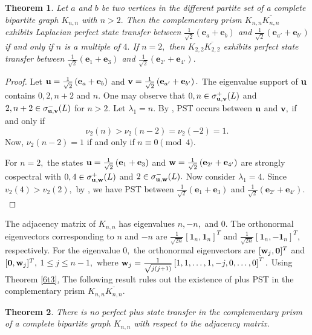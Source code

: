 \documentclass[12pt,a4paper]{article}
\newtheorem{thm}{Theorem}
\def \e {{\bf e}}
\def \u {{\bf u}}
\def \v {{\bf v}}
\def \w {{\bf w}}
\def \e {{\mathbf e}}
\newcommand{\ob}[1]{\left(#1\right)}
\newcommand{\tb}[1]{\left[#1\right]}
\begin{document}
\begin{thm}
      Let $a$ and $b$ be two vertices in the different partite set of a complete bipartite graph $K_{n,n}$ with $n>2.$ Then the complementary prism $K_{n,n}\overline{K_{n,n}}$ exhibits Laplacian perfect state transfer between $\frac{1}{\sqrt{2}}(\e_a+\e_b)$ and $\frac{1}{\sqrt{2}}(\e_{a'}+\e_{b'})$ if and only if $n$ is a multiple of $4.$ If $n=2,$ then $K_{2,2}\overline{K_{2,2}}$ exhibits perfect state transfer between $\frac{1}{\sqrt{2}}\ob{\e_1+\e_3}$ and $\frac{1}{\sqrt{2}}\ob{\e_{2'}+\e_{4'}}.$
\end{thm}
\begin{proof}
Let $\u=\frac{1}{\sqrt{2}}\ob{\e_a+\e_b}$ and $\v=\frac{1}{\sqrt{2}}\ob{\e_{a'}+\e_{b'}}.$ The eigenvalue support of $\u$ contains $0,2,n+2$ and $n.$ One may observe that  $0,n\in\sigma_{\u,\v}^+(L)$ and $2,n+2\in \sigma_{\u,\v}^-(L)$ for $n>2.$ Let $\lambda_1=n.$ By \cite[Corollary 5.7(3)]{god7}, PST occurs between $\u$ and $\v,$ if and only if 
    \[\nu_2(n)>\nu_2(n-2)=\nu_2(-2)=1.\] 
    Now, $\nu_2(n-2)=1$ if and only if $n\equiv 0 \pmod {4}.$
    
For $n=2,$ the states $\u=\frac{1}{\sqrt{2}}\ob{\e_1+\e_3}$ and $\w=\frac{1}{\sqrt{2}}\ob{\e_{2'}+\e_{4'}}$ are strongly cospectral with $0,4\in \sigma_{\u,\w}^+(L)$ and $2\in \sigma_{\u,\w}^-(L).$ Now consider $\lambda_1=4.$ Since $v_2(4)>v_2(2),$  by \cite[Corollary 5.7(3)]{god7}, we have PST between $\frac{1}{\sqrt{2}}\ob{\e_1+\e_3}$ and $\frac{1}{\sqrt{2}}\ob{\e_{2'}+\e_{4'}}.$
\end{proof}
The adjacency matrix of $K_{n,n}$ has eigenvalues $n,-n,$ and $0.$ The orthonormal eigenvectors corresponding to $n$ and $-n$ are $\frac{1}{\sqrt{2n}}[\mathbf{1}_n, \mathbf{1}_n]^T$ and $\frac{1}{\sqrt{2n}}[\mathbf{1}_n, -\mathbf{1}_n]^T,$ respectively. For the eigenvalue $0,$ the orthonormal eigenvectors are  $[\w_j,\mathbf{0}]^T$ and  $[\mathbf{0},\w_j]^T,$  $1\leq j \leq n-1,$ where  $\w_j=\frac{1}{\sqrt {j(j+1)}}\tb{1,1,\ldots,1,-j,0,\ldots,0}^T.$
Using Theorem \ref{6t3}, 
The following result rules out the existence of plus PST in the complementary prism $K_{n,n}\overline{K_{n,n}}.$
\begin{thm}\label{6t13}
    There is no perfect plus state transfer in the complementary prism of a complete bipartite graph $K_{n,n}$ with respect to the adjacency matrix.
\end{thm}
\end{document}

